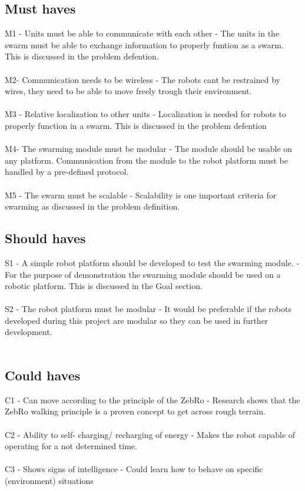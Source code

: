 \documentclass[10pt,a4paper]{article}
\begin{document}
\subsection{Must haves}


M1 - Units must be able to communicate with each other - The units in the swarm must be able to exchange information to properly funtion as a swarm. This is discussed in the problem defention\cite{multidomaincom}. \\\\
M2- Communication needs to be wireless - The robots cant be restrained by wires, they need to be able to move freely trough their environment.\\\\
M3 - Relative localization to other units - Localization is needed for robots to properly function in a swarm. This is discussed in the problem defention\cite{multidomaincom}\\\\
M4- The swarming module must be modular - The module should be usable on any platform. Communication from the module to the robot platform must be handled by a pre-defined protocol.\\\\
M5 - The swarm must be scalable - Scalability is one important criteria  for swarming as discussed in the problem definition.


\subsection{Should haves}

S1 - A simple robot platform should be developed to test the swarming module. - For the purpose of demonstration the swarming module should be used on a robotic platform. This is discussed in the Goal section.\\\\
S2 - The robot platform must be modular - It would be preferable if the robots developed during this project are modular so they can be used in further development.\\\\


\subsection{Could haves}

C1 - Can move according to the principle of the ZebRo - Research shows that the ZebRo walking principle is a proven concept to get across rough terrain.\\\\
C2 - Ability to self- charging/ recharging of energy - Makes the robot capable of operating for a not determined time.\\\\
C3 - Shows signs of intelligence - Could learn how to behave on specific (environment) situations\\\\
\end{document}
